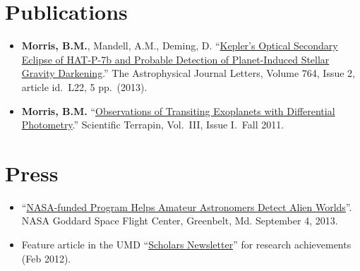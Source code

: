 \documentclass[margin]{res}
\begin{document}
\begin{resume}
\section{Publications} 
                 \begin{itemize}   
                  \item \textbf{Morris, B.M.}, Mandell, A.M., Deming, D. ``\href{http://adsabs.harvard.edu/abs/2013ApJ...764L..22M}{Kepler's Optical Secondary Eclipse of HAT-P-7b and Probable Detection of Planet-Induced Stellar Gravity Darkening}.'' The Astrophysical Journal Letters, Volume 764, Issue 2, article id.\ L22, 5 pp.\ (2013).
		\item \textbf{Morris, B.M.} ``\href{http://www.scientificterrapin.umd.edu/Fall2011.php}{Observations of Transiting Exoplanets with Differential Photometry}.'' Scientific Terrapin, Vol.\ III, Issue I.\ Fall 2011.\\
                 \end{itemize}

\section{Press} 
                 \begin{itemize}
                 \item ``\href{http://www.nasa.gov/content/nasa-funded-program-helps-amateur-astronomers-detect-alien-worlds/}{NASA-funded Program Helps Amateur Astronomers Detect Alien Worlds}''. NASA Goddard Space Flight Center, Greenbelt, Md. September 4, 2013.
		\item Feature article in the UMD ``\href{http://www.scholars.umd.edu/news/newsletter/363-february-2012-issue-1}{Scholars Newsletter}'' for research achievements (Feb 2012).\\
                 \end{itemize}              


\end{resume}
\end{document}
